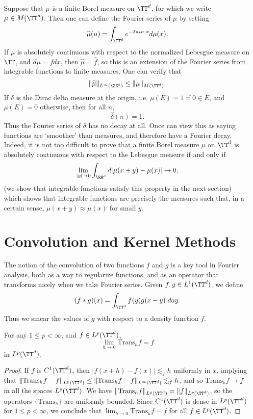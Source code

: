 \begin{remark}
    Suppose that $\mu$ is a finite Borel measure on $\TT^d$, for which we write $\mu \in M(\TT^d)$. Then one can define the Fourier series of $\mu$ by setting
    \[ \widehat{\mu}(n) = \int_{\TT^d} e^{-2 \pi i n \cdot x} d\mu(x). \]
    If $\mu$ is absolutely continuous with respect to the normalized Lebesgue measure on $\TT$, and $d\mu = f dx$, then $\widehat{\mu} = \widehat{f}$, so this is an extension of the Fourier series from integrable functions to finite measures. One can verify that
    \[ \| \widehat{\mu} \|_{L^\infty(\ZZ^d)} \leq \| \mu \|_{M(\TT^d)}. \]
    If $\delta$ is the Dirac delta measure at the origin, i.e. $\mu(E) = 1$ if $0 \in E$, and $\mu(E) = 0$ otherwise, then for all $n$,
    \[ \widehat{\delta}(n) = 1. \]
    Thus the Fourier series of $\delta$ has no decay at all. Once can view this as saying functions are `smoother' than measures, and therefore have a Fourier decay. Indeed, it is not too difficult to prove that a finite Borel measure $\mu$ on $\TT^d$ is absolutely continuous with respect to the Lebesgue measure if and only if
    \[ \lim_{|y| \to 0} \int_{\RR^d} d|\mu(x + y) - \mu(x)| \to 0, \]
    (we show that integrable functions satisfy this property in the next section) which shows that integrable functions are precisely the measures such that, in a certain sense, $\mu(x + y) \approx \mu(x)$ for small $y$.
\end{remark}

\section{Convolution and Kernel Methods}

The notion of the convolution of two functions $f$ and $g$ is a key tool in Fourier analysis, both as a way to regularize functions, and as an operator that transforms nicely when we take Fourier series. Given $f,g \in L^1(\TT^d)$, we define
%
\[ (f * g)(x) = \int_{\TT^d} f(y) g(x-y)\; day. \]
%
Thus we smear the values of $g$ with respect to a density function $f$.

\begin{lemma}
    For any $1 \leq p < \infty$, and $f \in L^p(\TT^d)$,
    \[ \lim_{h \to 0} \text{Trans}_h f = f \]
    in $L^p(\TT^d)$.
\end{lemma}
\begin{proof}
    If $f$ is $C^1(\TT^d)$, then $|f(x + h) - f(x)| \lesssim_f h$ uniformly in $x$, implying that $\| \text{Trans}_h f - f \|_{L^p(\TT^d)} \leq \| \text{Trans}_hf - f \|_{L^\infty(\TT^d)} \lesssim_f h$, and so $\text{Trans}_h f \to f$ in all the spaces $L^p(\TT^d)$. We have $\| \text{Trans}_h f \|_{L^p(\TT^d)} = \| f \|_{L^p(\TT^d)}$, so the operators $\{ \text{Trans}_h \}$ are uniformly bounded. Since $C^1(\TT^d)$ is dense in $L^p(\TT^d)$ for $1 \leq p < \infty$, we conclude that $\lim_{h \to 0} \text{Trans}_h f = f$ for all $f \in L^p(\TT^d)$.
\end{proof}

